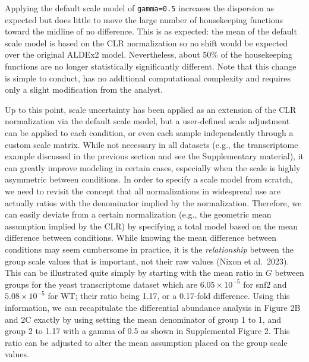\documentclass[
]{article}
\begin{document}
Applying the default scale model of \texttt{gamma=0.5} increases the
dispersion as expected but does little to move the large number of
housekeeping functions toward the midline of no difference. This is as
expected: the mean of the default scale model is based on the CLR
normalization so no shift would be expected over the original ALDEx2
model. Nevertheless, about 50\% of the housekeeping functions are no
longer statistically significantly different. Note that this change is
simple to conduct, has no additional computational complexity and
requires only a slight modification from the analyst.

Up to this point, scale uncertainty has been applied as an extension of
the CLR normalization via the default scale model, but a user-defined
scale adjustment can be applied to each condition, or even each sample
independently through a custom scale matrix. While not necessary in all
datasets (e.g., the transcriptome example discussed in the previous
section and see the Supplementary material), it can greatly improve
modeling in certain cases, especially when the scale is highly
asymmetric between conditions. In order to specify a scale model from
scratch, we need to revisit the concept that all normalizations in
widespread use are actually ratios with the denominator implied by the
normalization. Therefore, we can easily deviate from a certain
normalization (e.g., the geometric mean assumption implied by the CLR)
by specifying a total model based on the mean difference between
conditions. While knowing the mean difference between conditions may
seem cumbersome in practice, it is the \emph{relationship} between the
group scale values that is important, not their raw values (Nixon et
al.~2023). This can be illustrated quite simply by starting with the
mean ratio in \(G\) between groups for the yeast transcriptome dataset
which are \(6.05\times 10^{-5}\) for snf2 and \(5.08\times 10^{-5}\) for
WT; their ratio being 1.17, or a 0.17-fold difference. Using this
information, we can recapitulate the differential abundance analysis in
Figure 2B and 2C exactly by using setting the mean denominator of group
1 to 1, and group 2 to 1.17 with a gamma of 0.5 as shown in Supplemental
Figure 2. This ratio can be adjusted to alter the mean assumption placed
on the group scale values.
\end{document}
